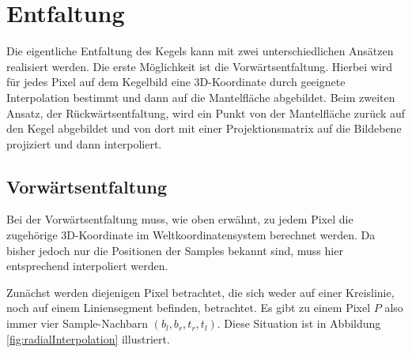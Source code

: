 \section{Entfaltung}
\label{s:unfolding}
Die eigentliche Entfaltung des Kegels kann mit zwei unterschiedlichen Ansätzen realisiert werden.
Die erste Möglichkeit ist die Vorwärtsentfaltung. Hierbei wird für jedes Pixel auf dem Kegelbild eine 3D-Koordinate durch geeignete Interpolation bestimmt und dann auf die Mantelfläche abgebildet. Beim zweiten Ansatz, der Rückwärtsentfaltung, wird ein Punkt von der Mantelfläche zurück auf den Kegel abgebildet und von dort mit einer Projektionsmatrix auf die Bildebene projiziert und dann interpoliert.

\subsection{Vorwärtsentfaltung}
Bei der Vorwärtsentfaltung muss, wie oben erwähnt, zu jedem Pixel die zugehörige 3D-Koordinate im Weltkoordinatensystem berechnet werden. Da bisher jedoch nur die Positionen der Samples bekannt sind, muss hier entsprechend interpoliert werden.

Zunächst werden diejenigen Pixel betrachtet, die sich weder auf einer Kreislinie, noch auf einem Liniensegment befinden, betrachtet. Es gibt zu einem Pixel $P$ also immer vier Sample-Nachbarn $(b_l, b_r, t_r, t_l)$. Diese Situation ist in Abbildung \ref{fig:radialInterpolation} illustriert.

